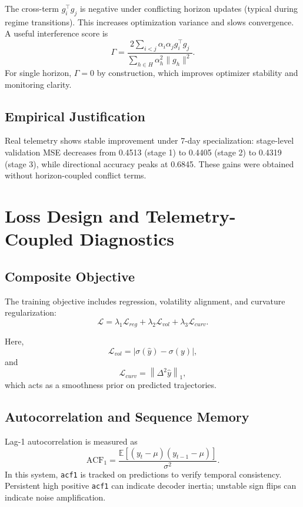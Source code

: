 \documentclass{article}
\begin{document}
The cross-term $g_i^\top g_j$ is negative under conflicting horizon updates (typical during regime transitions). This increases optimization variance and slows convergence. A useful interference score is
\begin{equation}
\Gamma=\frac{2\sum_{i<j}\alpha_i\alpha_j g_i^\top g_j}{\sum_{h \in H}\alpha_h^2\|g_h\|^2}.
\end{equation}
For single horizon, $\Gamma=0$ by construction, which improves optimizer stability and monitoring clarity.

\subsection{Empirical Justification}
Real telemetry shows stable improvement under 7-day specialization: stage-level validation MSE decreases from 0.4513 (stage 1) to 0.4405 (stage 2) to 0.4319 (stage 3), while directional accuracy peaks at 0.6845. These gains were obtained without horizon-coupled conflict terms.

\section{Loss Design and Telemetry-Coupled Diagnostics}
\subsection{Composite Objective}
The training objective includes regression, volatility alignment, and curvature regularization:
\begin{equation}
\mathcal{L} = \lambda_1 \mathcal{L}_{reg} + \lambda_2 \mathcal{L}_{vol} + \lambda_3 \mathcal{L}_{curv}.
\end{equation}

Here,
\begin{equation}
\mathcal{L}_{vol}=\left|\sigma(\hat{y})-\sigma(y)\right|,
\end{equation}
and
\begin{equation}
\mathcal{L}_{curv}=\left\|\Delta^2 \hat{y}\right\|_1,
\end{equation}
which acts as a smoothness prior on predicted trajectories.

\subsection{Autocorrelation and Sequence Memory}
Lag-1 autocorrelation is measured as
\begin{equation}
\text{ACF}_1 = \frac{\mathbb{E}[(y_t - \mu)(y_{t-1} - \mu)]}{\sigma^2}.
\end{equation}
In this system, \texttt{acf1} is tracked on predictions to verify temporal consistency. Persistent high positive \texttt{acf1} can indicate decoder inertia; unstable sign flips can indicate noise amplification.
\end{document}
